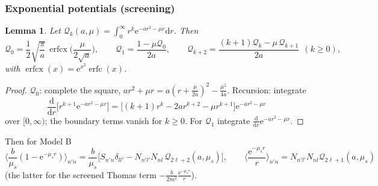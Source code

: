 \documentclass[11pt,a4paper]{article}
\numberwithin{equation}{section}
\theoremstyle{definition}
\theoremstyle{plain}
\newtheorem{lemma}[definition]{Lemma}
\theoremstyle{remark}
\numberwithin{algorithm}{section}
\newcommand{\dd}{\mathrm{d}}
\newcommand{\ee}{\mathrm{e}}
\newcommand{\erfc}{\operatorname{erfc}}
\newcommand{\erfcx}{\operatorname{erfcx}}
\newcommand{\mus}{\mu_s}
\begin{document}
\subsubsection{Exponential potentials (screening)}
\begin{lemma}
Let $\mathcal Q_k(a,\mu)=\int_0^\infty r^k\ee^{-ar^2-\mu r}\dd r$. Then
\begin{equation}
\mathcal Q_0=\frac12\sqrt{\frac\pi a}\,\erfcx\Big(\frac{\mu}{2\sqrt a}\Big),\qquad \mathcal Q_1=\frac{1-\mu\mathcal Q_0}{2a},\qquad
\mathcal Q_{k+2}=\frac{(k+1)\mathcal Q_k-\mu\,\mathcal Q_{k+1}}{2a}\ \ (k\ge0),
\end{equation}
with $\erfcx(x)=\ee^{x^2}\erfc(x)$.
\end{lemma}
\begin{proof}
$\mathcal Q_0$: complete the square, $ar^2+\mu r=a(r+\frac{\mu}{2a})^2-\frac{\mu^2}{4a}$. Recursion: integrate
\[
\frac{\dd}{\dd r}\big[r^{k+1}\ee^{-ar^2-\mu r}\big]=\big[(k+1)r^k-2ar^{k+2}-\mu r^{k+1}\big]\ee^{-ar^2-\mu r}
\]
over $[0,\infty)$; the boundary terms vanish for $k\ge0$. For $\mathcal Q_1$ integrate $\frac{\dd}{\dd r}\ee^{-ar^2-\mu r}$.
\end{proof}
Then for Model B
\begin{equation}
\Big\langle\frac{b}{\mus}(1-\ee^{-\mus r})\Big\rangle_{n'n}=\frac b{\mus}\Big[S_{n'n}\delta_{ll'}-N_{n'l'}N_{nl}\,\mathcal Q_{2\ell+2}(a,\mus)\Big],\qquad
\Big\langle\frac{\ee^{-\mus r}}{r}\Big\rangle_{n'n}=N_{n'l'}N_{nl}\mathcal Q_{2\ell+1}(a,\mus)
\end{equation}
(the latter for the screened Thomas term $-\frac{b}{2m^2}\frac{\ee^{-\mus r}}{r}$).
\end{document}
